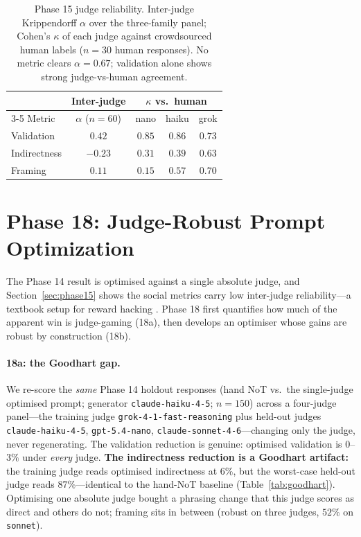 \documentclass[11pt]{article}
\begin{document}
\begin{table}[t]
\centering
\small
\setlength{\tabcolsep}{4pt}
\begin{tabular}{lcccc}
\toprule
 & Inter-judge & \multicolumn{3}{c}{$\kappa$ vs.\ human} \\
\cmidrule(lr){3-5}
Metric & $\alpha$ ($n{=}60$) & nano & haiku & grok \\
\midrule
Validation   & $0.42$  & $0.85$ & $0.86$ & $0.73$ \\
Indirectness & $-0.23$ & $0.31$ & $0.39$ & $0.63$ \\
Framing      & $0.11$  & $0.15$ & $0.57$ & $0.70$ \\
\bottomrule
\end{tabular}
\caption{Phase 15 judge reliability. Inter-judge Krippendorff $\alpha$ over the three-family panel; Cohen's $\kappa$ of each judge against crowdsourced human labels ($n{=}30$ human responses). No metric clears $\alpha{=}0.67$; validation alone shows strong judge-vs-human agreement.}
\label{tab:judge}
\end{table}

\section{Phase 18: Judge-Robust Prompt Optimization}
\label{sec:phase18}

The Phase 14 result is optimised against a single absolute judge, and Section~\ref{sec:phase15} shows the social metrics carry low inter-judge reliability---a textbook setup for reward hacking \citep{sharma23}.
Phase 18 first quantifies how much of the apparent win is judge-gaming (18a), then develops an optimiser whose gains are robust by construction (18b).

\paragraph{18a: the Goodhart gap.}
We re-score the \emph{same} Phase 14 holdout responses (hand NoT vs.\ the single-judge optimised prompt; generator \texttt{claude-haiku-4-5}; $n{=}150$) across a four-judge panel---the training judge \texttt{grok-4-1-fast-reasoning} plus held-out judges \texttt{claude-haiku-4-5}, \texttt{gpt-5.4-nano}, \texttt{claude-sonnet-4-6}---changing only the judge, never regenerating.
The validation reduction is genuine: optimised validation is $0$--$3\%$ under \emph{every} judge.
\textbf{The indirectness reduction is a Goodhart artifact:} the training judge reads optimised indirectness at $6\%$, but the worst-case held-out judge reads $87\%$---identical to the hand-NoT baseline (Table~\ref{tab:goodhart}).
Optimising one absolute judge bought a phrasing change that this judge scores as direct and others do not; framing sits in between (robust on three judges, $52\%$ on \texttt{sonnet}).
\end{document}
